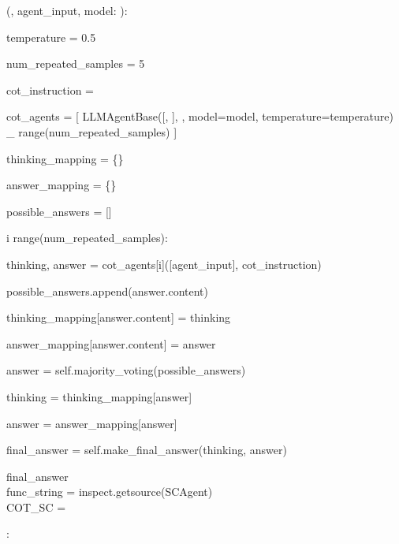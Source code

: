 \begin{subagent}[title={SCAgent}]
      (, agent\_input, model: ):

\quad {}

\quad temperature = 0.5

\quad num\_repeated\_samples = 5

\quad {}

\quad cot\_instruction = 

\quad {}

\quad cot\_agents = [
\quad\quad LLMAgentBase([, ],
\quad\quad {},
\quad\quad model=model,
\quad\quad temperature=temperature)
\quad\quad {} \_  range(num\_repeated\_samples)
\quad ]

\quad thinking\_mapping = \{\}

\quad answer\_mapping = \{\}

\quad possible\_answers = []

\quad {} i  range(num\_repeated\_samples):

\quad\quad thinking, answer =  cot\_agents[i]([agent\_input], cot\_instruction)

\quad\quad possible\_answers.append(answer.content)

\quad\quad thinking\_mapping[answer.content] = thinking

\quad\quad answer\_mapping[answer.content] = answer

\quad {}

\quad answer = self.majority\_voting(possible\_answers)

\quad thinking = thinking\_mapping[answer]

\quad answer = answer\_mapping[answer]

\quad final\_answer = self.make\_final\_answer(thinking, answer)

\quad {} final\_answer \\

func\_string = inspect.getsource(SCAgent) \\

COT\_SC = \code{\{}

\quad {}:


\end{subagent}
